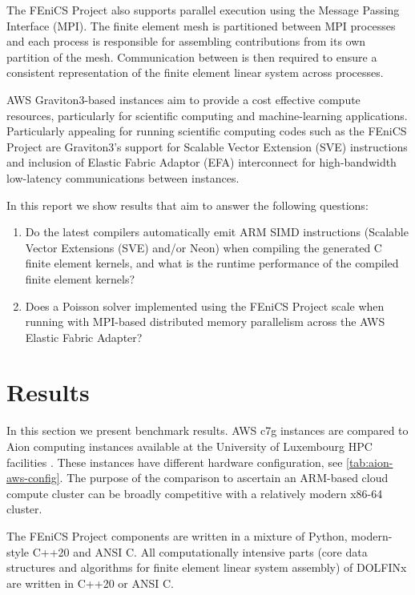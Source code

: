 The FEniCS Project also supports parallel execution using the Message Passing
Interface (MPI). The finite element mesh is partitioned between MPI processes
and each process is responsible for assembling contributions from its own
partition of the mesh. Communication between is then required to ensure a
consistent representation of the finite element linear system across processes.

AWS Graviton3-based instances aim to provide a cost effective compute resources,
particularly for scientific computing and machine-learning applications.
Particularly appealing for running scientific computing codes such as the FEniCS
Project are Graviton3's support for Scalable Vector Extension (SVE) instructions
and inclusion of Elastic Fabric Adaptor (EFA) interconnect for high-bandwidth
low-latency communications between instances.

In this report we show results that aim to answer the following questions:
\begin{enumerate}
\item Do the latest compilers automatically emit ARM SIMD instructions (Scalable
      Vector Extensions (SVE) and/or Neon) when compiling the generated C finite
      element kernels, and what is the runtime performance of the compiled
      finite element kernels?
\item Does a Poisson solver implemented using the FEniCS Project scale when
      running with MPI-based distributed memory parallelism across the AWS
      Elastic Fabric Adapter?
\end{enumerate}

\section*{Results}
In this section we present benchmark results. AWS c7g instances are compared to
Aion computing instances available at the University of Luxembourg HPC
facilities \cite{VCPKVO_HPCCT22}. These instances have different hardware
configuration, see \autoref{tab:aion-aws-config}. The purpose of the comparison
to ascertain an ARM-based cloud compute cluster can be broadly competitive with
a relatively modern x86-64 cluster.

The FEniCS Project components are written in a mixture of Python, modern-style
C++20 and ANSI C. All computationally intensive parts (core data structures and
algorithms for finite element linear system assembly) of DOLFINx are written in
C++20 or ANSI C.

